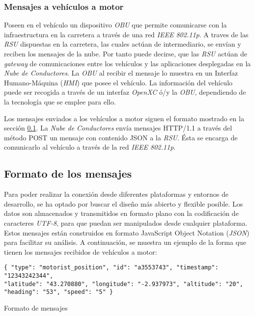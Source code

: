 \subsubsection{Mensajes a vehículos a motor}\label{sssection:mensajesvehiculomotor}
Poseen en el vehículo un dispositivo \emph{OBU} que permite comunicarse con la infraestructura en la carretera a través de una red \emph{IEEE 802.11p}. A traves de las \emph{RSU} dispuestas en la carretera, las cuales actúan de intermediario, se envían y reciben los mensajes de la nube. Por tanto puede decirse, que las \emph{RSU} actúan de \emph{gateway} de comunicaciones entre los vehículos y las aplicaciones desplegadas en la \emph{Nube de Conductores}. La \emph{OBU} al recibir el mensaje lo muestra en un Interfaz Humano-Máquina (\emph{HMI}) que posee el vehículo. La información del vehículo puede ser recogida a través de un interfaz \emph{OpenXC} ó/y la \emph{OBU}, dependiendo de la tecnología que se emplee para ello.

Los mensajes enviados a los vehículos a motor siguen el formato mostrado en la sección \ref{ssection:FormatoMensajesNC}. La \emph{Nube de Conductores} envía mensajes HTTP/1.1 a través del método POST un mensaje con contenido JSON a la \emph{RSU}. \'Esta se encarga de comunicarlo al vehículo a través de la red \emph{IEEE 802.11p}.


\subsection{Formato de los mensajes}\label{ssection:FormatoMensajesNC}
Para poder realizar la conexión desde diferentes plataformas y entornos de desarrollo, se ha optado por buscar el diseño más abierto y flexible posible. Los datos son almacenados y transmitidos en formato plano con la codificación de caracteres \emph{UTF-8}, para que puedan ser manipulados desde cualquier plataforma. Estos mensajes están construidos en formato JavaScript Object Notation (\emph{JSON}) para facilitar su análisis. A continuación, se muestra un ejemplo de la forma que tienen los mensajes recibidos de vehículos a motor:

\begin{listing}
	\begin{minipage}{.4\textwidth}
		\begin{verbatim}
{ "type": "motorist_position", "id": "a3553743", "timestamp": "12343242344", 
"latitude": "43.270880", "longitude": "-2.937973", "altitude": "20", 
"heading": "53", "speed": "5" }			
		\end{verbatim}
	\end{minipage}
	\caption{Formato de mensajes}\label{alg:formatoMensajes}
\end{listing}

